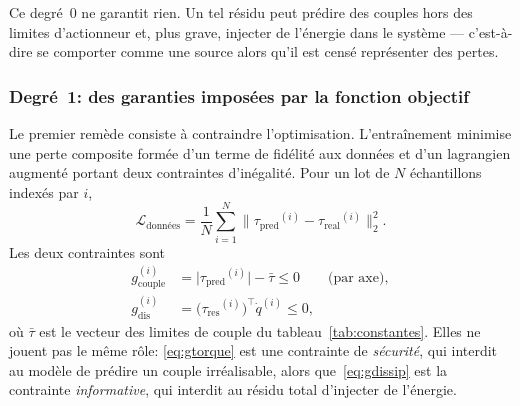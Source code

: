 \documentclass[a4paper, oneside]{article}
\newcommand{\qd}{\ensuremath{\dot{q}}}
\newcommand{\taures}{\ensuremath{\tau_{\mathrm{res}}}}
\newcommand{\taupred}{\ensuremath{\tau_{\mathrm{pred}}}}
\newcommand{\taureal}{\ensuremath{\tau_{\mathrm{real}}}}
\begin{document}
Ce degré~0 ne garantit rien. Un tel résidu peut prédire des couples hors des
limites d'actionneur et, plus grave, injecter de l'énergie dans le système —
c'est-à-dire se comporter comme une source alors qu'il est censé représenter des
pertes.

\subsubsection{Degré~1: des garanties imposées par la fonction objectif}
\label{sec:degre1}

Le premier remède consiste à contraindre l'optimisation. L'entraînement minimise
une perte composite formée d'un terme de fidélité aux données et d'un lagrangien
augmenté portant deux contraintes d'inégalité. Pour un lot de $N$ échantillons
indexés par $i$,
%
\begin{equation}
    \mathcal{L}_{\text{données}}
    = \frac{1}{N}\sum_{i=1}^{N}
      \bigl\| \taupred^{(i)} - \taureal^{(i)} \bigr\|_2^{2} .
    \label{eq:Ldata}
\end{equation}
%
Les deux contraintes sont
%
\begin{align}
    g_{\mathrm{couple}}^{(i)} &= \bigl|\taupred^{(i)}\bigr| - \bar{\tau} \le 0
    \qquad \text{(par axe)}, \label{eq:gtorque}\\
    g_{\mathrm{dis}}^{(i)} &= \bigl(\taures^{(i)}\bigr)^{\top}\qd^{(i)} \le 0 ,
    \label{eq:gdissip}
\end{align}
%
où $\bar{\tau}$ est le vecteur des limites de couple du
tableau~\ref{tab:constantes}. Elles ne jouent pas le même rôle:
\eqref{eq:gtorque} est une contrainte de \emph{sécurité}, qui interdit au modèle
de prédire un couple irréalisable, alors que~\eqref{eq:gdissip} est la
contrainte \emph{informative}, qui interdit au résidu total d'injecter de
l'énergie.
\end{document}
